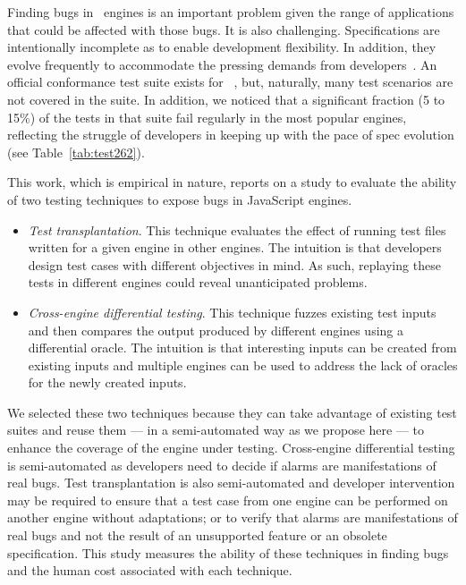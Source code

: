 \documentclass[smallextended]{svjour3}
\begin{document}
Finding bugs in \js\ engines is an important problem given the range
of applications that could be affected with those bugs. It is also
challenging.  Specifications are intentionally incomplete as to enable
development flexibility. In addition, they evolve frequently to
accommodate the pressing demands from
developers~\cite{ecmas262-spec-repo}. An official conformance test
suite exists for \js~\cite{tc39-github}, but, naturally, many test
scenarios are not covered in the suite. In addition, we noticed that a
significant fraction (5 to 15\%) of the tests in that suite fail
regularly in the most popular engines, reflecting the struggle of developers in keeping
up with the pace of spec evolution (see Table~\ref{tab:test262}).

This work, which is empirical in nature, reports on a study to evaluate
the ability of two testing techniques to expose bugs in JavaScript engines.

\begin{itemize}[topsep=0pt,parsep=0pt,partopsep=2pt,labelwidth=0cm,align=left,itemindent=-0.25cm]
\item \emph{Test transplantation}.
  This technique evaluates the effect of running test files
  written for a given engine in other engines. The intuition is that
  developers design test cases with different objectives in mind. As
  such, replaying these tests in different engines could reveal
  unanticipated problems.

\item \emph{Cross-engine differential testing}.  This technique fuzzes
  existing test inputs~\cite{fuzz-testing-history} and then compares
  the output produced by different engines using a differential
  oracle. The intuition is that interesting inputs can be created from
  existing inputs and multiple engines can be used to address the lack
  of oracles for the newly created inputs.
\end{itemize}

We selected these two techniques because they can take advantage
of existing test suites and reuse them --- in a semi-automated way
as we propose here --- to enhance the coverage of the engine under testing.
Cross-engine differential testing is semi-automated as
developers need to decide if alarms are manifestations of real
bugs.
Test transplantation is also semi-automated
and developer intervention may be required to ensure that a test case from one engine can be performed on another engine without adaptations;
or to verify that alarms are manifestations of real bugs and not the result of an unsupported feature or an obsolete specification.
This study measures the ability of these techniques
in finding bugs and the human cost associated with each technique.
\end{document}
